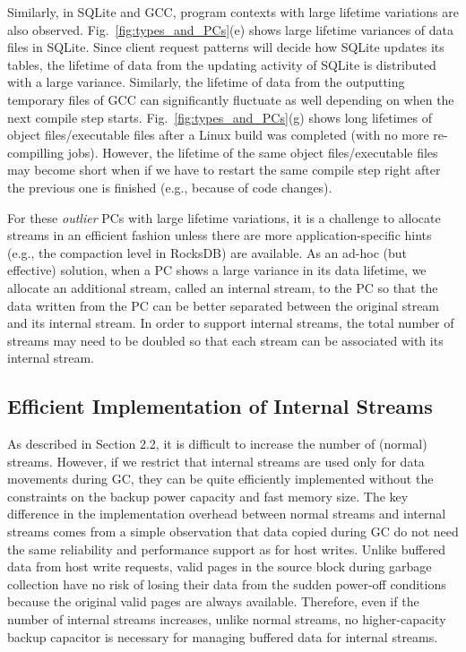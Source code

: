 Similarly, in SQLite and GCC, program contexts with large lifetime variations
are also observed.
Fig.~\ref{fig:types_and_PCs}(e) shows large lifetime variances of data files in
SQLite.
Since client request patterns will decide how SQLite updates its tables, 
the lifetime of data from the updating activity of SQLite is distributed 
with a large variance.  Similarly, the lifetime of
data from the outputting temporary files of GCC can significantly fluctuate 
as well depending on when the next compile step starts.   
Fig.~\ref{fig:types_and_PCs}(g) shows long lifetimes of 
object files/executable files after 
{\color{blue}
a Linux build was completed
(with no more re-compilling jobs).
However, the lifetime of the same object files/executable files 
may become short when if we have to restart the same
compile step right after the previous one is finished
(e.g., because of code changes).
}

For these {\it outlier} PCs with large lifetime variations, 
it is a challenge to allocate streams in an efficient fashion unless 
there are more application-specific hints (e.g., the compaction level in
RocksDB) are available.  
As an ad-hoc (but effective) solution, when a PC shows a large variance 
in its data lifetime, we allocate an additional stream, called an internal stream, 
to the PC so that
the data written from the PC can be better separated between the original 
stream and its internal stream.  
In order to support internal streams, the total number of streams may 
need to be doubled so
that each stream can be associated with its internal stream.


\subsection{Efficient Implementation of Internal Streams}
As described in Section 2.2, it is difficult to increase the number of 
(normal) streams.  However, 
if we restrict that internal streams are used only for data movements
during GC,
they can be quite efficiently
implemented without the constraints on the backup power capacity and fast memory size.  
The key difference in the implementation overhead between normal streams and 
internal streams comes from a simple observation that data copied during 
GC do not need the same reliability and performance support as for host writes.  
Unlike buffered data from host write requests, valid pages in
the source block during garbage collection have no risk of losing their data 
from the sudden power-off conditions because the original valid pages are always available.    
Therefore, even if the
number of internal streams increases, unlike normal streams, 
no higher-capacity backup capacitor is necessary for managing buffered data for internal streams. 

